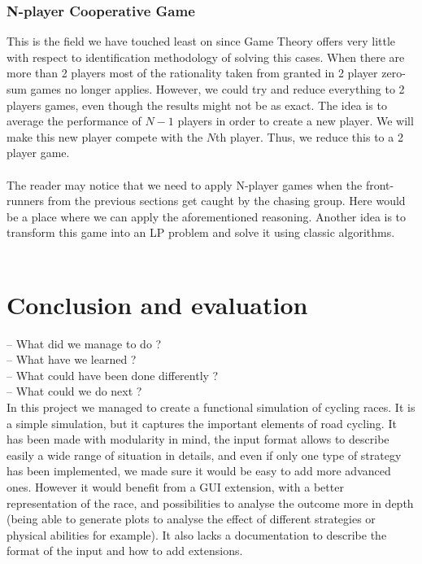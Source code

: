 \documentclass[10pt, a4paper]{report}
\begin{document}
\subsection{N-player Cooperative Game}\label{subsec:nplaycoopgame}
This is the field we have touched least on since Game Theory offers very little with respect to identification methodology of solving this cases. When there are more than 2 players most of the rationality taken from granted in 2 player zero-sum games no longer applies. However, we could try and reduce everything to 2 players games, even though the results might not be as exact. The idea is to average the performance of $N-1$ players in order to create a new player. We will make this new player compete with the $N$th player. Thus, we reduce this to a 2 player game.\\\\
The reader may notice that we need to apply N-player games when the front-runners from the previous sections get caught by the chasing group. Here would be a place where we can apply the aforementioned reasoning. Another idea is to transform this game into an LP problem and solve it using classic algorithms.
\\\\


\chapter{Conclusion and evaluation}\label{ch:concl}

-- What did we manage to do ? \\

-- What have we learned ? \\

-- What could have been done differently ? \\

-- What could we do next ? \\

In this project we managed to create a functional simulation of cycling races. It is a simple simulation, but it captures the important elements of road cycling. It has been made with modularity in mind, the input format allows to describe easily a wide range of situation in details, and even if only one type of strategy has been implemented, we made sure it would be easy to add more advanced ones. However it would benefit from a GUI extension, with a better representation of the race, and possibilities to analyse the outcome more in depth (being able to generate plots to analyse the effect of different strategies or physical abilities for example). It also lacks a documentation to describe the format of the input and how to add extensions. \\
\end{document}
